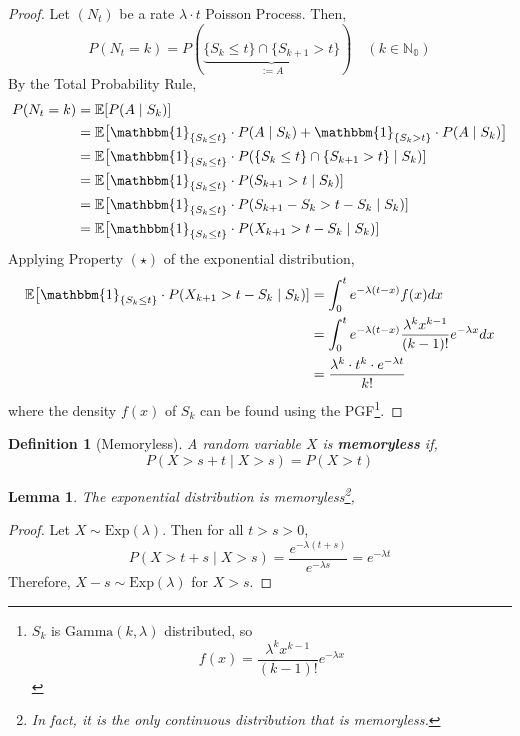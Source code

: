 \documentclass{tufte-handout}
\newtheorem{lem}[thm]{Lemma}
\newtheorem{defn}[thm]{Definition}
\begin{document}
\begin{proof}
  Let $(N_t)$ be a rate $\lambda \cdot t$ Poisson Process. Then,
  \[P(N_t = k) = P(\underbrace{\{S_k \leq t\} \cap \{S_{k+1} > t\}}_{:=A}) \quad (k \in \mathbb{N_0})\]
  By the Total Probability Rule,
  \begin{align*}
    P(N_t = k) &= \mathbb{E}[P(A \mid S_k)] \\
               &= \mathbb{E}\big[\mathbbm{1}_{\{S_k \leq t\}} \cdot P(A \mid S_k) + \mathbbm{1}_{\{S_k > t\}} \cdot P(A \mid S_k)\big] \\
               &= \mathbb{E}\big[\mathbbm{1}_{\{S_k \leq t\}} \cdot P(\{S_k \leq t\} \cap \{S_{k+1} > t\} \mid S_k)] \\
               &= \mathbb{E}\big[\mathbbm{1}_{\{S_k \leq t\}} \cdot P(S_{k+1} > t \mid S_k)] \\
               &= \mathbb{E}\big[\mathbbm{1}_{\{S_k \leq t\}} \cdot P(S_{k+1} - S_k > t - S_k \mid S_k)] \\
               &= \mathbb{E}\big[\mathbbm{1}_{\{S_k \leq t\}} \cdot P(X_{k+1} > t - S_k \mid S_k)]
  \end{align*}
  \noindent Applying Property $(\star)$ of the exponential distribution,
  \begin{align*}
    \mathbb{E}\big[\mathbbm{1}_{\{S_k \leq t\}} \cdot P(X_{k+1} > t - S_k \mid S_k)]
    &= \int_0^t e^{-\lambda (t - x)} f(x) d x \\
    &= \int_0^t e^{-\lambda (t - x)} \frac{\lambda^{k} x^{k-1}}{(k-1) !} e^{-\lambda x} d x \\
    &= \frac{\lambda^k \cdot t^k \cdot e^{-\lambda t}}{k !}
  \end{align*}
  \noindent where the density $f(x)$ of $S_k$ can be found using the PGF\footnote{$S_k$ is $\text{Gamma}(k, \lambda)$ distributed, so \[f(x) = \frac{\lambda^{k} x^{k-1}}{(k-1) !} e^{-\lambda x}\]}.
\end{proof}

\begin{defn}[Memoryless]
  A random variable $X$ is \textbf{memoryless} if,
  \[P(X > s + t \mid X > s) = P(X > t)\]
\end{defn}

\begin{lem}
  The exponential distribution is memoryless\footnote{In fact, it is the only continuous distribution that is memoryless.},
\end{lem}

\begin{proof}
  Let $X \sim \text{Exp}(\lambda)$. Then for all $t > s > 0$,
    \[
    P(X > t + s \mid X > s) = \frac{e^{-\lambda(t+s)}}{e^{-\lambda s}}=e^{-\lambda t}
    \]
  \noindent Therefore, $X - s \sim \text{Exp}(\lambda)$ for $X > s$.
\end{proof}
\end{document}
